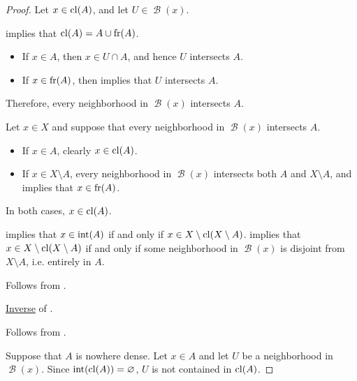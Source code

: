 \begin{proof}
  \SufficiencySubProof* Let \( x \in \operatorname{cl}(A) \), and let \( U \in \mscrB(x) \).

   implies that \( \operatorname{cl}(A) = A \cup \operatorname{fr}(A) \).
  \begin{itemize}
    \item If \( x \in A \), then \( x \in U \cap A \), and hence \( U \) intersects \( A \).
    \item If \( x \in \operatorname{fr}(A) \), then  implies that \( U \) intersects \( A \).
  \end{itemize}

  Therefore, every neighborhood in \( \mscrB(x) \) intersects \( A \).

  \NecessitySubProof* Let \( x \in X \) and suppose that every neighborhood in \( \mscrB(x) \) intersects \( A \).

  \begin{itemize}
    \item If \( x \in A \), clearly \( x \in \operatorname{cl}(A) \).
    \item If \( x \in X \setminus A \), every neighborhood in \( \mscrB(x) \) intersects both \( A \) and \( X \setminus A \), and  implies that \( x \in \operatorname{fr}(A) \).
  \end{itemize}

  In both cases, \( x \in \operatorname{cl}(A) \).

    implies that \( x \in \operatorname{int}(A) \) if and only if \( x \in X \setminus \operatorname{cl}(X \setminus A) \).  implies that \( x \in X \setminus \operatorname{cl}(X \setminus A) \) if and only if some neighborhood in \( \mscrB(x) \) is disjoint from \( X \setminus A \), i.e. entirely in \( A \).

   Follows from .

   \hyperref[def:conditional_formula/inverse]{Inverse} of .

   Follows from .


  \SufficiencySubProof* Suppose that \( A \) is nowhere dense. Let \( x \in A \) and let \( U \) be a neighborhood in \( \mscrB(x) \). Since \( \operatorname{int}(\operatorname{cl}(A)) = \varnothing \), \( U \) is not contained in \( \operatorname{cl}(A) \).


\end{proof}
